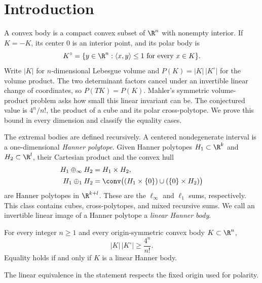\section{Introduction}\label{sec:introduction}

A convex body is a compact convex subset of $\R^n$ with nonempty
interior. If $K=-K$, its center $0$ is an interior point, and its
polar body is
\[
 K^\circ=\{y\in\R^n:\langle x,y\rangle\le1
                         \text{ for every }x\in K\}.
\]
Write $|K|$ for $n$-dimensional Lebesgue volume and
$P(K)=|K|\,|K^\circ|$ for the volume product. The two determinant
factors cancel under an invertible linear change of coordinates, so
$P(TK)=P(K)$. Mahler's symmetric volume-product problem asks how small
this linear invariant can be. The conjectured value is $4^n/n!$,
the product of a cube and its polar cross-polytope. We prove this bound
in every dimension and classify the equality cases.

The extremal bodies are defined recursively. A centered nondegenerate
interval is a one-dimensional \emph{Hanner polytope}. Given Hanner
polytopes $H_1\subset\R^k$ and $H_2\subset\R^l$, their Cartesian
product and the convex hull
\[
 \begin{aligned}
 H_1\oplus_\infty H_2&=H_1\times H_2,\\
 H_1\oplus_1 H_2&=
 \conv\bigl((H_1\times\{0\})\cup(\{0\}\times H_2)\bigr)
 \end{aligned}
\]
are Hanner polytopes in $\R^{k+l}$. These are the $\ell_\infty$ and
$\ell_1$ sums, respectively. This class contains cubes, cross-polytopes,
and mixed recursive sums. We call an invertible linear image of a
Hanner polytope a \emph{linear Hanner body}.

\begin{theorem}\label{thm:main}
For every integer $n\ge1$ and every origin-symmetric convex body
$K\subset\R^n$,
\begin{equation}\label{eq:main-inequality}
 |K|\,|K^\circ|\ge\frac{4^n}{n!}.
\end{equation}
Equality holds if and only if $K$ is a linear Hanner body.
\end{theorem}

The linear equivalence in the statement respects the fixed origin
used for polarity.
